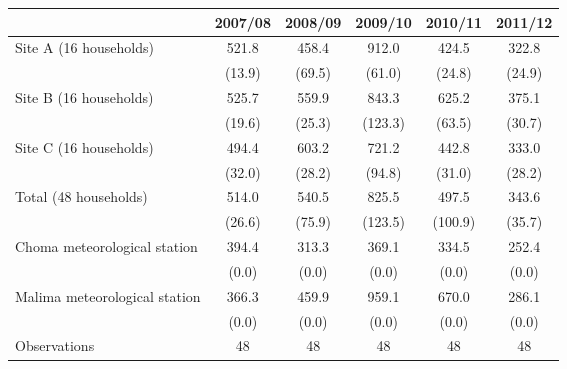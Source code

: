 {
\def\sym#1{\ifmmode^{#1}\else\(^{#1}\)\fi}
\begin{tabular}{l*{5}{c}}
\hline\hline
                    &\multicolumn{1}{c}{2007/08}&\multicolumn{1}{c}{2008/09}&\multicolumn{1}{c}{2009/10}&\multicolumn{1}{c}{2010/11}&\multicolumn{1}{c}{2011/12}\\
\hline
Site A (16 households)&       521.8         &       458.4         &       912.0         &       424.5         &       322.8         \\
                    &      (13.9)         &      (69.5)         &      (61.0)         &      (24.8)         &      (24.9)         \\
Site B (16 households)&       525.7         &       559.9         &       843.3         &       625.2         &       375.1         \\
                    &      (19.6)         &      (25.3)         &     (123.3)         &      (63.5)         &      (30.7)         \\
Site C (16 households)&       494.4         &       603.2         &       721.2         &       442.8         &       333.0         \\
                    &      (32.0)         &      (28.2)         &      (94.8)         &      (31.0)         &      (28.2)         \\
Total (48 households)&       514.0         &       540.5         &       825.5         &       497.5         &       343.6         \\
                    &      (26.6)         &      (75.9)         &     (123.5)         &     (100.9)         &      (35.7)         \\
Choma meteorological station&       394.4         &       313.3         &       369.1         &       334.5         &       252.4         \\
                    &       (0.0)         &       (0.0)         &       (0.0)         &       (0.0)         &       (0.0)         \\
Malima meteorological station&       366.3         &       459.9         &       959.1         &       670.0         &       286.1         \\
                    &       (0.0)         &       (0.0)         &       (0.0)         &       (0.0)         &       (0.0)         \\
\hline
Observations        &          48         &          48         &          48         &          48         &          48         \\
\hline\hline
\end{tabular}
}
